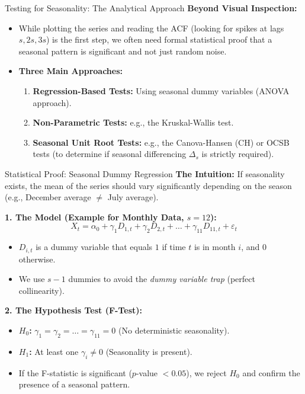 \documentclass[aspectratio=169]{beamer}
\begin{document}
\begin{frame}{Testing for Seasonality: The Analytical Approach}
\textbf{Beyond Visual Inspection:}
\begin{itemize}
    \item While plotting the series and reading the ACF (looking for spikes at lags $s, 2s, 3s$) is the first step, we often need formal statistical proof that a seasonal pattern is significant and not just random noise.
    
    \vspace{0.3cm}
    
    \item \textbf{Three Main Approaches:}
    \begin{enumerate}
        \item \textbf{Regression-Based Tests:} Using seasonal dummy variables (ANOVA approach).
        \item \textbf{Non-Parametric Tests:} e.g., the Kruskal-Wallis test.
        \item \textbf{Seasonal Unit Root Tests:} e.g., the Canova-Hansen (CH) or OCSB tests (to determine if seasonal differencing $\Delta_s$ is strictly required).
    \end{enumerate}
\end{itemize}
\end{frame}

\begin{frame}{Statistical Proof: Seasonal Dummy Regression}
\textbf{The Intuition:} If seasonality exists, the mean of the series should vary significantly depending on the season (e.g., December average $\neq$ July average).

\vspace{0.2cm}

\textbf{1. The Model (Example for Monthly Data, $s=12$):}
\[
X_t = \alpha_0 + \gamma_1 D_{1,t} + \gamma_2 D_{2,t} + \dots + \gamma_{11} D_{11,t} + \varepsilon_t
\]
\begin{itemize}
    \item $D_{i,t}$ is a dummy variable that equals $1$ if time $t$ is in month $i$, and $0$ otherwise.
    \item We use $s-1$ dummies to avoid the \textit{dummy variable trap} (perfect collinearity).
\end{itemize}

\vspace{0.2cm}

\textbf{2. The Hypothesis Test (F-Test):}
\begin{itemize}
    \item \textbf{$H_0$:} $\gamma_1 = \gamma_2 = \dots = \gamma_{11} = 0$ (No deterministic seasonality).
    \item \textbf{$H_1$:} At least one $\gamma_i \neq 0$ (Seasonality is present).
    \item If the F-statistic is significant ($p$-value $< 0.05$), we reject $H_0$ and confirm the presence of a seasonal pattern.
\end{itemize}
\end{frame}
\end{document}
